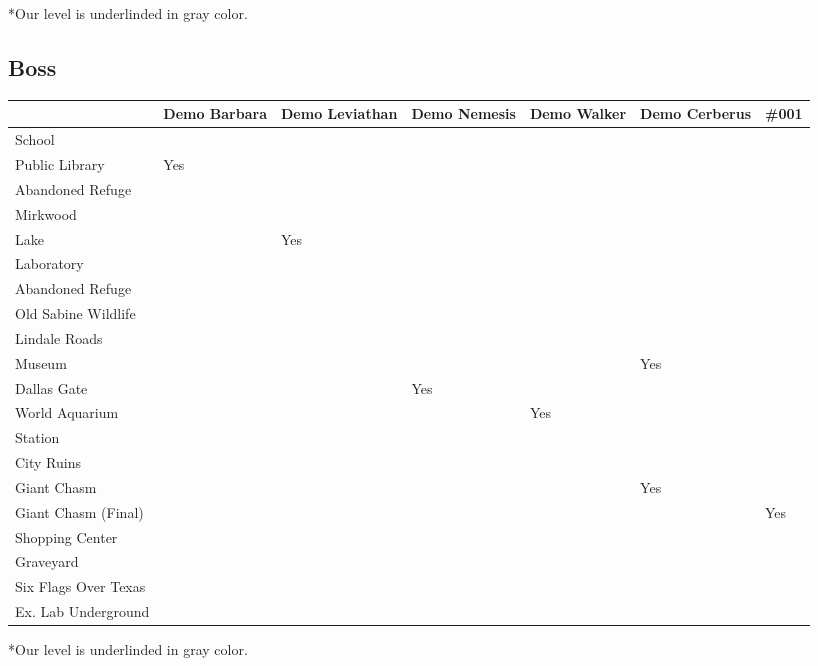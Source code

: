 \vspace*{0.2cm}

*Our level is underlinded in gray color.

\newpage

\subsection{Boss}

\vspace*{0.2cm}

\begin{center}
	\begin{tabular}[c]{| p{3.8cm} | p{1.5cm} | p{1.5cm} | p{1.5cm} | p{1.5cm} | p{1.5cm} | p{1cm} |}
		\hline
		& Demo Barbara & Demo Leviathan & Demo Nemesis & Demo Walker & Demo Cerberus & \#001\\
		\hline
		School & & & & & &\\
		\hline
		Public Library & Yes & & & & & \\
		\hline
		Abandoned Refuge & & & & & & \\
		\hline
		Mirkwood & & & & & &\\
		\hline
		Lake & & Yes & & & &\\
		\hline
		Laboratory & & & & & &\\
		\hline
		Abandoned Refuge & & & & & &\\
		\hline
		Old Sabine Wildlife & & & & & &\\
		\hline
		Lindale Roads & & & & & &\\
		\hline
		Museum & & & & & Yes & \\
		\hline
		Dallas Gate & & & Yes & & &\\
		\hline
		World Aquarium & & & & Yes & &\\
		\hline
		Station & & & & && \\
		\hline
		City Ruins & & & & & & \\
		\hline \rowcolor{light-light-gray}
		Giant Chasm & & & & & Yes &\\
		\hline
		Giant Chasm (Final) & & & & & & Yes\\
		\hline
		Shopping Center & & & & & &\\
		\hline
		Graveyard & & & & & &\\
		\hline
		Six Flags Over Texas & & & & & &\\
		\hline
		Ex. Lab Underground & & & & & & \\
		\hline
	\end{tabular}
\end{center}

\vspace*{0.2cm}

*Our level is underlinded in gray color.
